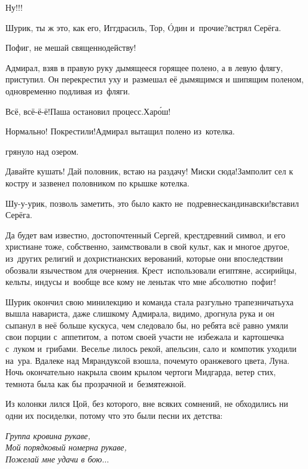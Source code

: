 \diagdash Ну!!!

\diagdash Шурик, ты ж это, как его, Иггдрасиль, Тор, {\'{O}}дин и~прочие?\mdash встрял Серёга.

\diagdash Пофиг, не мешай священнодейству!

Адмирал, взяв в правую руку дымящееся горящее полено, а в левую флягу, приступил. Он перекрестил уху и~размешал её дымящимся и шипящим поленом, одновременно подливая из~фляги.

\diagdash Всё, всё-ё-ё!\mdash Паша остановил процесс.\mdash Хар{\'о}ш!

\diagdash Нормально! Покрестили!\mdash Адмирал вытащил полено из~котелка.

\mdash грянуло над озером.

\diagdash Давайте кушать! Дай половник, встаю на раздачу! Миски сюда!\mdash Замполит сел к костру и зазвенел половником по крышке котелка.

\diagdash Шу-у-урик, позволь заметить, это было как\sdash то не~по\sdash древнескандинавски!\mdash вставил Серёга.

\diagdash Да будет вам известно, достопочтенный Сергей, крест\mdash древний символ, и его христиане тоже, собственно, заимствовали в свой культ, как и многое другое, из~других религий и дохристианских верований, которые они впоследствии обозвали язычеством для очернения. Крест~использовали египтяне, ассирийцы, кельты, индусы и~вообще все кому не лень\mdash так что мне абсолютно~пофиг! 

Шурик окончил свою мини\sdash лекцию и команда стала разгульно трапезничать\mdash уха вышла навариста, даже слишком\mdash у Адмирала, видимо, дрогнула рука и он сыпанул в неё больше кус\sdash куса, чем следовало бы, но ребята всё равно умяли свои порции с~аппетитом, а~потом своей участи не~избежала и~картошечка с~луком и~грибами. Веселье лилось рекой, апельсин, сало и~компотик уходили на~ура. Вдалеке над Мярандуксой взошла, почему\sdash то оранжевого цвета, Луна. Ночь окончательно накрыла своим крылом чертоги Мидгарда, ветер стих, темнота была как бы прозрачной и~безмятежной.

Из колонки лился Цой, без которого, вне всяких сомнений, не обходились ни одни их посиделки, потому что это были песни их детства:

\vspace{0.1cm}
\noindent\textit{%
	\hspace*{2.5cm}Группа крови\mdash на рукаве,\\	
	\hspace*{2.5cm}Мой порядковый номер\mdash на рукаве,\\
	\hspace*{2.5cm}Пожелай мне удачи в бою$\ldots$%
}

